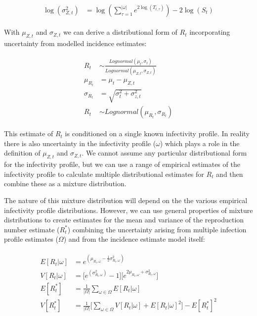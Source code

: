 \documentclass[10pt,letterpaper]{article}
\begin{document}
\begin{eqnarray}
\begin{aligned}
\log(\sigma_{Z,t}^2) &= \log(
	    \sum_{\tau=1}^{|\omega|} {
  	      e^{
  	        2 \log(T_{t,\tau})
  	      }
	    }) - 2 \log(S_{t})
\end{aligned}
\end{eqnarray}


With $\mu_{Z,t}$ and $\sigma_{Z,t}$ we can derive a distributional form of $R_t$ incorporating uncertainty from modelled incidence estimates:

\begin{eqnarray}
\label{eq:final}
\begin{aligned}
R_t &\sim \frac{Lognormal(\mu_t,\sigma_t)}
{Lognormal( \mu_{Z,t}, \sigma_{Z,t})} \\
\mu_{R_t} &= \mu_t - \mu_{Z,t} \\
\sigma_{R_t} &= \sqrt{\sigma_t^2+\sigma_{z,t}^2} \\
R_t &\sim Lognormal(\mu_{R_t}, \sigma_{R_t})
\end{aligned}
\end{eqnarray}

This estimate of $R_t$ is conditioned on a single known infectivity profile. In reality there is also uncertainty in the infectivity profile ($\omega$) which plays a role in the definition of $\mu_{Z,t}$ and $\sigma_{Z,t}$. We cannot assume any particular distributional form for the infectivity profile, but we can use a range of empirical estimates of the infectivity profile to calculate multiple distributional estimates for $R_t$ and then combine these as a mixture distribution.

The nature of this mixture distribution will depend on the the various empirical infectivity profile distributions. However, we can use general properties of mixture distributions to create estimates for the mean and variance of the reproduction number estimate ($R_t^*$) combining the uncertainty arising from multiple infection profile estimates ($\Omega$) and from the incidence estimate model itself:

\begin{eqnarray}
\label{eq:final_2}
\begin{aligned}
E[R_t|\omega] &= e^{(\mu_{R_t,\omega} - \frac{1}{2}\sigma_{R_t,\omega}^2)} \\
V[R_t|\omega] &= \big[e^{(\sigma_{R_t,\omega}^2)} - 1\big] \big[e^{2 \mu_{R_t,\omega} + \sigma_{R_t,\omega}^2}\big] \\
E[R_t^*] &= \frac{1}{|\Omega|}\sum_{\omega \in \Omega} E[{R_t|\omega}] \\
V[R_t^*] &= \frac{1}{|\Omega|} \bigg[\sum_{\omega \in \Omega}{V[R_t|\omega]+E[R_t|\omega]^2}\bigg] - E[R_t^*]^2 \\
\end{aligned}
\end{eqnarray}
\end{document}
